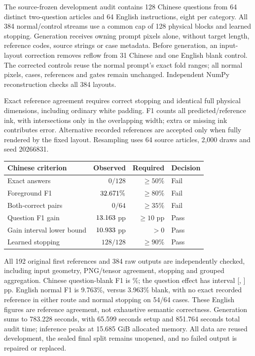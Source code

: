 \documentclass[10pt,a4paper]{article}
\begin{document}
The source-frozen development audit contains 128 Chinese questions from
64 distinct two-question articles and 64 English instructions, eight per
category. All 384 normal/control streams use a common cap of 128 physical
blocks and learned stopping. Generation receives owning prompt pixels alone,
without target length, reference codes, source strings or case metadata.
Before generation, an input-layout correction removes reflow from 31 Chinese
and one English blank control. The corrected controls reuse the normal
prompt's exact fold ranges; all normal pixels, cases, references and gates
remain unchanged. Independent NumPy reconstruction checks all 384 layouts.

Exact reference agreement requires correct stopping and identical full
physical dimensions, including ordinary white padding. F1 counts all
predicted/reference ink, with intersections only in the overlapping width;
extra or missing ink contributes error. Alternative recorded references are
accepted only when fully rendered by the fixed layout. Resampling uses
64 source articles, 2,000 draws and seed 20266831.

\begin{center}\small
\begin{tabular}{lrrl}
\toprule
Chinese criterion & Observed & Required & Decision\\
\midrule
Exact answers & $0/128$ & $\geq50\%$ & Fail\\
Foreground F1 & $32.671\%$ & $\geq80\%$ & Fail\\
Both-correct pairs & $0/64$ & $\geq35\%$ & Fail\\
Question F1 gain & $13.163$ pp & $\geq10$ pp & Pass\\
Gain interval lower bound & $10.933$ pp & $>0$ & Pass\\
Learned stopping & $128/128$ & $\geq90\%$ & Pass\\
\bottomrule
\end{tabular}
\end{center}

All 192 original first references and 384 raw outputs are independently
checked, including input geometry, PNG/tensor agreement, stopping and grouped
aggregation. Chinese question-blank F1 is \CodecLanguageBlankFOne\%; the
question effect has interval [\CodecLanguageCILow, \CodecLanguageCIHigh] pp.
English normal F1 is 9.763\%, versus 3.963\% blank, with no exact recorded
reference in either route and normal stopping on 54/64 cases. These English
figures are reference agreement, not exhaustive semantic correctness.
Generation sums to 783.228 seconds, with 65.599 seconds setup and 851.764
seconds total audit time; inference peaks at 15.685 GiB allocated memory.
All data are reused development, the sealed final split remains unopened,
and no failed output is repaired or replaced.
\end{document}
